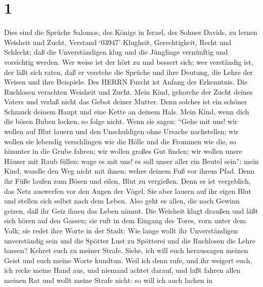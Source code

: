 \hypertarget{section}{%
\section{1}\label{section}}

 Dies sind die Sprüche Salomos, des Königs in Israel, des
Sohnes Davids,  zu lernen Weisheit und Zucht, Verstand
 `03947' Klugheit, Gerechtigkeit, Recht und Schlecht;
 daß die Unverständigen klug und die Jünglinge vernünftig
und vorsichtig werden.  Wer weise ist der hört zu und
bessert sich; wer verständig ist, der läßt sich raten,  daß
er verstehe die Sprüche und ihre Deutung, die Lehre der Weisen und ihre
Beispiele.  Des HERRN Furcht ist Anfang der Erkenntnis. Die
Ruchlosen verachten Weisheit und Zucht.  Mein Kind, gehorche
der Zucht deines Vaters und verlaß nicht das Gebot deiner Mutter.
 Denn solches ist ein schöner Schmuck deinem Haupt und eine
Kette an deinem Hals.  Mein Kind, wenn dich die bösen Buben
locken, so folge nicht.  Wenn sie sagen: ``Gehe mit uns!
wir wollen auf Blut lauern und den Unschuldigen ohne Ursache
nachstellen;  wir wollen sie lebendig verschlingen wie die
Hölle und die Frommen wie die, so hinunter in die Grube fahren;
 wir wollen großes Gut finden; wir wollen unsre Häuser mit
Raub füllen;  wage es mit uns! es soll unser aller ein
Beutel sein'':  mein Kind, wandle den Weg nicht mit ihnen;
wehre deinem Fuß vor ihrem Pfad.  Denn ihr Füße laufen zum
Bösen und eilen, Blut zu vergießen.  Denn es ist
vergeblich, das Netz auswerfen vor den Augen der Vögel. 
Sie aber lauern auf ihr eigen Blut und stellen sich selbst nach dem
Leben.  Also geht es allen, die nach Gewinn geizen, daß ihr
Geiz ihnen das Leben nimmt.  Die Weisheit klagt draußen und
läßt sich hören auf den Gassen;  sie ruft in dem Eingang
des Tores, vorn unter dem Volk; sie redet ihre Worte in der Stadt:
 Wie lange wollt ihr Unverständigen unverständig sein und
die Spötter Lust zu Spötterei und die Ruchlosen die Lehre hassen?
 Kehret euch zu meiner Strafe. Siehe, ich will euch
heraussagen meinen Geist und euch meine Worte kundtun. 
Weil ich denn rufe, und ihr weigert euch, ich recke meine Hand aus, und
niemand achtet darauf,  und laßt fahren allen meinen Rat
und wollt meine Strafe nicht:  so will ich auch lachen in

